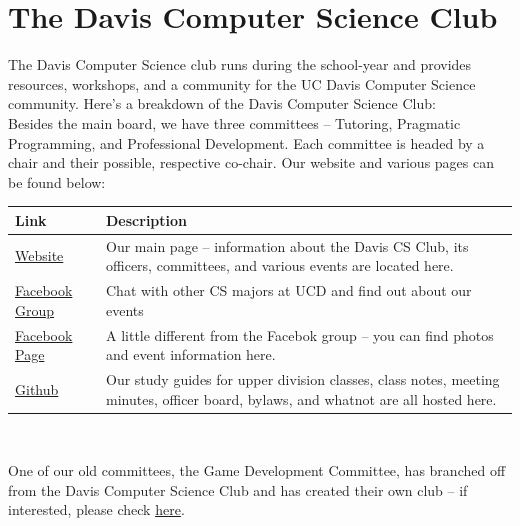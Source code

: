 \documentclass{article}
\begin{document}
\newpage
\section {The Davis Computer Science Club}
\label{sec:DCSC}
\hspace{0.5cm}The Davis Computer Science club runs during the school-year and provides resources, workshops, and a community for the UC Davis Computer Science community. Here's a breakdown of the Davis Computer Science Club:\\

Besides the main board, we have three committees -- Tutoring, Pragmatic Programming, and Professional Development. Each committee is headed by a chair and their possible, respective co-chair. Our website and various pages can be found below: \\
\begin{center}
{\tabulinesep=1.2mm
\begin{tabu} {|p{3cm} |p{8cm}|}
\hline
\textbf{Link} & \textbf{Description} \\ 
\hline
\href{http://daviscsclub.org}{Website} & Our main page -- information about the Davis CS Club, its officers, committees, and various events are located here. \\
\hline
\href{https://www.facebook.com/groups/daviscsclub/}{Facebook Group} & Chat with other CS majors at UCD and find out about our events \\
\hline
\href{https://www.facebook.com/daviscsclub}{Facebook Page} & A little different from the Facebok group -- you can find photos and event information here.\\
\hline
\href{https://github.com/DavisCSClub}{Github} & Our study guides for upper division classes, class notes, meeting minutes, officer board, bylaws, and whatnot are all hosted here.\\
\hline
\end{tabu}}\\
\end{center}
\hspace{0.5cm} One of our old committees, the Game Development Committee, has branched off from the Davis Computer Science Club and has created their own club -- if interested, please check \href{https://www.facebook.com/groups/davisgamedev/}{here}.
\end{document}
